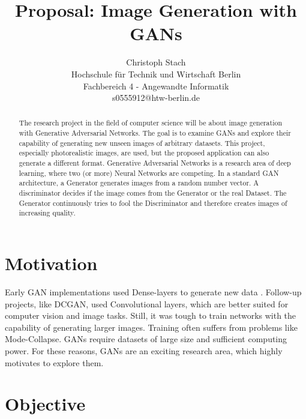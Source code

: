 \documentclass[]{article}
\begin{document}
\title{\textbf{Proposal: Image Generation with GANs}}

\author{
  Christoph Stach\\
  Hochschule für Technik und Wirtschaft Berlin\\
  Fachbereich 4 - Angewandte Informatik\\
  s0555912@htw-berlin.de
}
\maketitle

\begin{abstract}

\noindent
The research project in the field of computer science will be about image generation with Generative Adversarial Networks. The goal is to examine GANs and explore their capability of generating new unseen images of arbitrary datasets. This project, especially photorealistic images, are used, but the proposed application can also generate a different format. Generative Adversarial Networks is a research area of deep learning, where two (or more) Neural Networks are competing. In a standard GAN architecture, a Generator generates images from a random number vector. A discriminator decides if the image comes from the Generator or the real Dataset. The Generator continuously tries to fool the Discriminator and therefore creates images of increasing quality.

\end{abstract}


\section{Motivation}

\noindent
Early GAN implementations used Dense-layers to generate new data \cite{goodfellow2014generative}. Follow-up projects, like DCGAN, \cite{radford2016unsupervised} used Convolutional layers, which are better suited for computer vision and image tasks. Still, it was tough to train networks with the capability of generating larger images. Training often suffers from problems like Mode-Collapse. GANs require datasets of large size and sufficient computing power. For these reasons, GANs are an exciting research area, which highly motivates to explore them.


\section{Objective}
\end{document}
